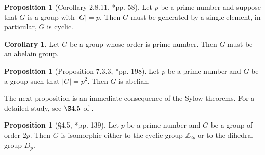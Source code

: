 \documentclass{amsart}
\theoremstyle{definition}
\newtheorem{proposition}[theorem]{Proposition}
\newtheorem{corollary}[theorem]{Corollary}
\theoremstyle{remark}
\numberwithin{equation}{section}
\begin{document}
    \begin{proposition}[Corollary 2.8.11, \cite{MR1129886}*{pp. 58}]
        Let $p$ be a prime number and suppose that $G$ is a group with $|G| = p$. Then $G$ must be generated by a single element, in particular, $G$ is cyclic.
    \end{proposition}
    \begin{corollary}\label{prime_order_is_abelian}
        Let $G$ be a group whose order is prime number. Then $G$ must be an abelain group.
    \end{corollary}
    \begin{proposition}[Proposition 7.3.3, \cite{MR1129886}*{pp. 198}]\label{p^2_is_abelian}
        Let $p$ be a prime number and $G$ be a group such that $|G| = p^2$. Then $G$ is abelian.
    \end{proposition}
    The next proposition is an immediate consequence of the Sylow theorems. For a detailed study, see $\S 4.5$ of \cite{MR2286236}.
    \begin{proposition}[\S 4.5, \cite{MR2286236}*{pp. 139}]\label{group_of_order_2p}
        Let $p$ be a prime number and $G$ be a group of order $2p$. Then $G$ is isomorphic either to the cyclic group $\mathbb{Z}_{2p}$ or to the dihedral group $D_p$.
    \end{proposition}
\end{document}

